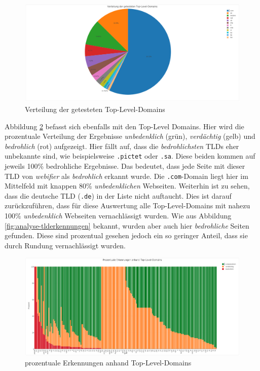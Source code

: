 \begin{figure}[H]
  \centering
  \includegraphics[width=\textwidth]{images/stats/tldverteilung}
  \caption[Verteilung der getesteten Top-Level-Domains]{Verteilung der getesteten Top-Level-Domains\protect\footnotemark}
  \label{fig:analyse-tldverteilung}
\end{figure}

Abbildung \ref{fig:analyse-tldprozentual} befasst sich ebenfalls mit den Top-Level Domains. Hier wird die prozentuale Verteilung der Ergebnisse \textit{unbedenklich} (grün), \textit{verdächtig} (gelb) und \textit{bedrohlich} (rot) aufgezeigt. Hier fällt auf, dass die \textit{bedrohlichsten} \acp{TLD} eher unbekannte sind, wie beispielsweise \lstinline[style=eclipse]{.pictet} oder \lstinline[style=eclipse]{.sa}. Diese beiden kommen auf jeweils 100\% bedrohliche Ergebnisse. Das bedeutet, dass jede Seite mit dieser \ac{TLD} von \textit{webifier} als \textit{bedrohlich} erkannt wurde. Die \lstinline[style=eclipse]{.com}-Domain liegt hier im Mittelfeld mit knappen 80\% \textit{unbedenklichen} Webseiten. Weiterhin ist zu sehen, dass die deutsche \ac{TLD} (\lstinline[style=eclipse]{.de}) in der Liste nicht auftaucht. Dies ist darauf zurückzuführen, dass für diese Auswertung alle Top-Level-Domains mit nahezu 100\% \textit{unbedenklich} Webseiten vernachlässigt wurden. Wie aus Abbildung \ref{fig:analyse-tlderkennungen} bekannt, wurden aber auch hier \textit{bedrohliche} Seiten gefunden. Diese sind prozentual gesehen jedoch ein so geringer Anteil, dass sie durch Rundung vernachlässigt wurden.

\begin{figure}[H]
  \centering
  \includegraphics[width=\textwidth]{images/stats/tldprozentual}
  \caption[prozentuale Erkennungen anhand Top-Level-Domains]{prozentuale Erkennungen anhand Top-Level-Domains\protect\footnotemark}
  \label{fig:analyse-tldprozentual}
\end{figure}

